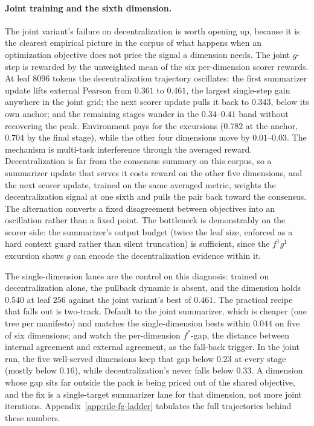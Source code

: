 \paragraph{Joint training and the sixth dimension.} The joint
variant's failure on decentralization is worth opening up, because it
is the clearest empirical picture in the corpus of what happens when
an optimization objective does not price the signal a dimension needs.
The joint $g$-step is rewarded by the unweighted mean of the six
per-dimension scorer rewards. At leaf $8096$ tokens the
decentralization trajectory oscillates: the first summarizer update
lifts external Pearson from $0.361$ to $0.461$, the largest
single-step gain anywhere in the joint grid; the next scorer update
pulls it back to $0.343$, below its own anchor; and the remaining
stages wander in the $0.34$--$0.41$ band without recovering the peak.
Environment pays for the excursions ($0.782$ at the anchor, $0.704$ by
the final stage), while the other four dimensions move by
$0.01$--$0.03$. The mechanism is multi-task interference through the
averaged reward. Decentralization is far from the consensus summary on
this corpus, so a summarizer update that serves it costs reward on the
other five dimensions, and the next scorer update, trained on the same
averaged metric, weights the decentralization signal at one sixth and
pulls the pair back toward the consensus. The alternation converts a
fixed disagreement between objectives into an oscillation rather than
a fixed point. The bottleneck is demonstrably on the scorer side: the
summarizer's output budget (twice the leaf size, enforced as a hard
context guard rather than silent truncation) is sufficient, since the
$f^1 g^1$ excursion shows $g$ can encode the decentralization evidence
within it.

The single-dimension lanes are the control on this diagnosis: trained
on decentralization alone, the pullback dynamic is absent, and the
dimension holds $0.540$ at leaf $256$ against the joint variant's
best of $0.461$. The practical recipe that falls out is two-track.
Default to the joint summarizer, which is cheaper (one tree per
manifesto) and matches the single-dimension bests within $0.044$ on
five of six dimensions; and watch the per-dimension $f^{*}$-gap, the
distance between internal agreement and external agreement, as the
fall-back trigger. In the joint run, the five well-served dimensions
keep that gap below $0.23$ at every stage (mostly below $0.16$), while
decentralization's never falls below $0.33$. A dimension whose gap sits
far outside the pack is being priced out of the shared objective, and
the fix is a single-target summarizer lane for that dimension, not
more joint iterations. Appendix~\ref{app:rile-fg-ladder} tabulates
the full trajectories behind these numbers.

